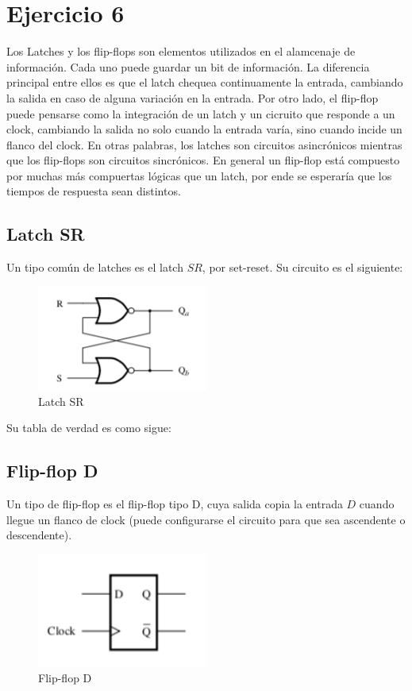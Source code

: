 \section{Ejercicio 6}


Los Latches y los flip-flops son elementos utilizados en el alamcenaje de información. Cada uno puede guardar un bit de información. La diferencia principal entre ellos es que el latch chequea continuamente la entrada, cambiando la salida en caso de alguna variaci\'on en la entrada. Por otro lado, el flip-flop puede pensarse como la integración de un latch y un cicruito que responde a un clock, cambiando la salida no solo cuando la entrada varía, sino cuando incide un flanco del clock. En otras palabras, los latches son circuitos asincrónicos mientras que los flip-flops son circuitos sincrónicos. En general un flip-flop está compuesto por muchas más compuertas lógicas que un latch, por ende se esperaría que los tiempos de respuesta sean distintos. 




\subsection{Latch SR}

Un tipo común de latches es el latch $SR$, por set-reset. Su circuito es el siguiente:

\begin{figure}[H]
	\centering
	\includegraphics[width=0.5\textwidth]{Ejercicio6/Recursos/latchSR}
	\caption{Latch SR}
\end{figure}

Su tabla de verdad es como sigue:


\subsection{Flip-flop D}
Un tipo de flip-flop es el flip-flop tipo D, cuya salida copia la entrada $D$ cuando llegue un flanco de clock (puede configurarse el circuito para que sea ascendente o descendente). 

\begin{figure}[H]
	\centering
	\includegraphics[width=0.5\textwidth]{Ejercicio6/Recursos/flipflopD}
	\caption{Flip-flop D}
\end{figure}

